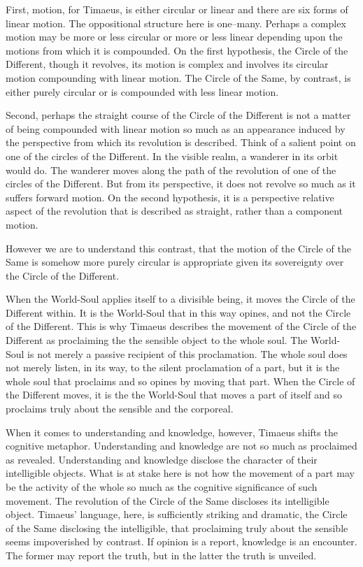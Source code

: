 First, motion, for Timaeus, is either circular or linear and there are six forms of linear motion. The oppositional structure here is one--many. Perhaps a complex motion may be more or less circular or more or less linear depending upon the motions from which it is compounded. On the first hypothesis, the Circle of the Different, though it revolves, its motion is complex and involves its circular motion compounding with linear motion. The Circle of the Same, by contrast, is either purely circular or is compounded with less linear motion. 

Second, perhaps the straight course of the Circle of the Different is not a matter of being compounded with linear motion so much as an appearance induced by the perspective from which its revolution is described. Think of a salient point on one of the circles of the Different. In the visible realm, a wanderer in its orbit would do. The wanderer moves along the path of the revolution of one of the circles of the Different. But from its perspective, it does not revolve so much as it suffers forward motion. On the second hypothesis, it is a perspective relative aspect of the revolution that is described as straight, rather than a component motion.

However we are to understand this contrast, that the motion of the Circle of the Same is somehow more purely circular is appropriate given its sovereignty over the Circle of the Different.

When the World-Soul applies itself to a divisible being, it moves the Circle of the Different within. It is the World-Soul that in this way opines, and not the Circle of the Different. This is why Timaeus describes the movement of the Circle of the Different as proclaiming the the sensible object to the whole soul. The World-Soul is not merely a passive recipient of this proclamation. The whole soul does not merely listen, in its way, to the silent proclamation of a part, but it is the whole soul that proclaims and so opines by moving that part. When the Circle of the Different moves, it is the the World-Soul that moves a part of itself and so proclaims truly about the sensible and the corporeal. 

When it comes to understanding and knowledge, however, Timaeus shifts the cognitive metaphor. Understanding and knowledge are not so much as proclaimed as revealed. Understanding and knowledge disclose the character of their intelligible objects. What is at stake here is not how the movement of a part may be the activity of the whole so much as the cognitive significance of such movement. The revolution of the Circle of the Same discloses its intelligible object. Timaeus' language, here, is sufficiently striking and dramatic, the Circle of the Same disclosing the intelligible, that proclaiming truly about the sensible seems impoverished by contrast. If opinion is a report, knowledge is an encounter. The former may report the truth, but in the latter the truth is unveiled.

